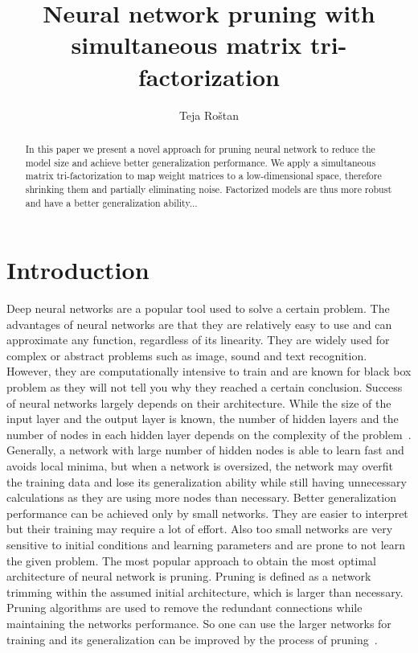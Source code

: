 \documentclass{article} %
\title{Neural network pruning with simultaneous matrix tri-factorization}
\author{Teja Ro\v{s}tan}
\begin{document}
\maketitle

\begin{abstract}

In this paper we present a novel approach for pruning neural network to reduce
the model size and achieve better generalization performance. We apply a
simultaneous matrix tri-factorization to map weight matrices to a
low-dimensional space, therefore shrinking them and partially eliminating
noise. Factorized models are thus more robust and have a better generalization
ability...

\end{abstract}

\section{Introduction}

Deep neural networks are a popular tool used to solve a certain problem. The
advantages of neural networks are that they are relatively easy to use and can
approximate any function, regardless of its linearity. They are widely used for
complex or abstract problems such as image, sound and text recognition.
However, they are computationally intensive to train and are known for black
box problem as they will not tell you why they reached a certain conclusion.
Success of neural networks largely depends on their architecture. While the
size of the input layer and the output layer is known, the number of hidden
layers and the number of nodes in each hidden layer depends on the complexity
of the problem~\cite{augasta2013pruning}. Generally, a network with large
number of hidden nodes is able to learn fast and avoids local minima, but when
a network is oversized, the network may overfit the training data and lose its
generalization ability while still having unnecessary calculations as they are
using more nodes than necessary. Better generalization performance can be
achieved only by small networks. They are easier to interpret but their
training may require a lot of effort. Also too small networks are very
sensitive to initial conditions and learning parameters and are prone to not
learn the given problem. The most popular approach to obtain the most optimal
architecture of neural network is pruning. Pruning is defined as a network
trimming within the assumed initial architecture, which is larger than
necessary. Pruning algorithms are used to remove the redundant connections
while maintaining the networks performance. So one can use the larger networks
for training and its generalization can be improved by the process of
pruning~\cite{augasta2013pruning}.
\end{document}
